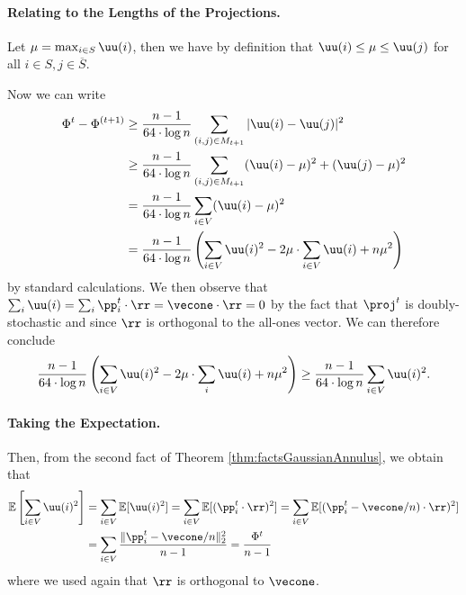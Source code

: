 \paragraph{Relating to the Lengths of the Projections.} Let $\mu = \max_{i \in S} \uu(i)$, then we have by definition that $\uu(i) \leq \mu \leq \uu(j)$ for all $i \in S, j \in \overline{S}$.

Now we can write 
\begin{align*}
     \Phi^{t} - \Phi^{(t+1)} &\geq \frac{n-1}{64 \cdot \log n} \sum_{(i,j) \in M_{t+1}} |\uu(i) - \uu(j)|^2 \\
     &\geq  \frac{n-1}{64 \cdot \log n} \sum_{(i,j) \in M_{t+1}}  (\uu(i) - \mu)^2 + (\uu(j) - \mu)^2\\
     &=  \frac{n-1}{64 \cdot \log n} \sum_{i \in V}  (\uu(i) - \mu)^2\\
     &=  \frac{n-1}{64 \cdot \log n}\left( \sum_{i \in V} \uu(i)^2 - 2\mu \cdot \sum_{i \in V} \uu(i) + n \mu^2 \right)
\end{align*}
by standard calculations. We then observe that $\sum_i \uu(i) = \sum_i \pp_i^t \cdot \rr = \vecone \cdot \rr = 0$ by the fact that $\proj^t$ is doubly-stochastic and since $\rr$ is orthogonal to the all-ones vector. We can therefore conclude 
\begin{equation}\label{eq:highProbBound}
\frac{n-1}{64 \cdot \log n}\left( \sum_{i \in V} \uu(i)^2 - 2\mu \cdot \sum_i \uu(i) + n \mu^2 \right) \geq \frac{n-1}{64 \cdot \log n} \sum_{i \in V} \uu(i)^2.
\end{equation}

\paragraph{Taking the Expectation.} Then, from the second fact of Theorem \ref{thm:factsGaussianAnnulus}, we obtain that 
\begin{align}\label{eq:potentialReductionExp}
\mathbb{E}\left[\sum_{i \in V} \uu(i)^2\right] &= \sum_{i \in V} \mathbb{E}[\uu(i)^2] = \sum_{i \in V} \mathbb{E}[(\pp_i^t \cdot \rr)^2] = \sum_{i \in V} \mathbb{E}[(\pp_i^t - \vecone/n) \cdot \rr)^2] \\ &= \sum_{i \in V} \frac{\|\pp_i^t - \vecone/n\|_2^2}{n-1} = \frac{\Phi^t}{n-1}
\end{align}
where we used again that $\rr$ is orthogonal to $\vecone$.

